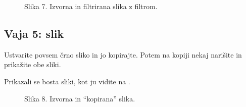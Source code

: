 \documentclass[letterpaper,10pt,english]{sphinxmanual}
\begin{document}
\begin{figure}[htbp]
\centering
\capstart

\noindent{}
\caption{Slika 7. Izvorna in filtrirana slika z  filtrom.}\label{\detokenize{uvod_py_opencv:id8}}\end{figure}


\subsection{Vaja 5:  slik}
\label{\detokenize{uvod_py_opencv:vaja-5-kopiranje-slik}}
\sphinxAtStartPar
Ustvarite povsem črno sliko in jo kopirajte. Potem na kopiji nekaj narišite in prikažite obe sliki.

\begin{sphinxVerbatim}[commandchars=\\\{\},numbers=left,firstnumber=1,stepnumber=1]
 
   

    

  

\PYG{p}{[} \PYG{p}{]}  

 
 

\end{sphinxVerbatim}

\sphinxAtStartPar
Prikazali se bosta sliki, kot ju vidite na .

\begin{figure}[htbp]
\centering
\capstart

\noindent{}
\caption{Slika 8. Izvorna in “kopirana” slika.}\label{\detokenize{uvod_py_opencv:id9}}\end{figure}
\end{document}
